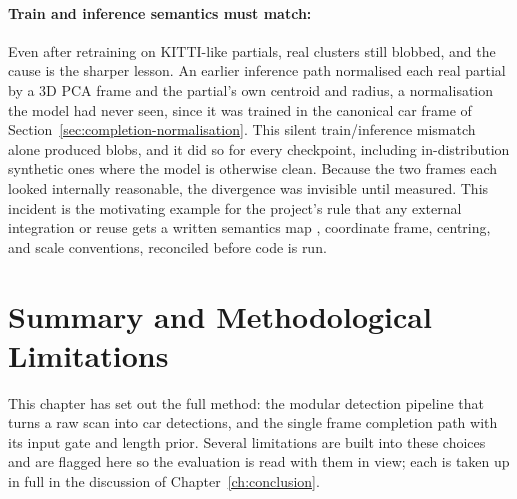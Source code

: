\documentclass[a4paper,12pt]{report}
\begin{document}
\paragraph{Train and inference semantics must match:}
\label{sec:completion-inferencebug}
Even after retraining on KITTI-like partials, real clusters still blobbed, and the
cause is the sharper lesson. An earlier inference path normalised each real partial by
a 3D PCA frame and the partial's own centroid and radius, a normalisation the
model had never seen, since it was trained in the canonical car frame of
Section~\ref{sec:completion-normalisation}. This silent train/inference mismatch alone
produced blobs, and it did so for every checkpoint, including in-distribution
synthetic ones where the model is otherwise clean. Because the two frames each looked
internally reasonable, the
divergence was invisible until measured. This incident is the motivating example for
the project's rule that any external integration or reuse gets a written semantics map
, coordinate frame, centring, and scale conventions, reconciled before code is
run.

\section{Summary and Methodological Limitations}
\label{sec:meth-limitations}

This chapter has set out the full method: the modular detection pipeline that turns a
raw scan into car detections, and the single frame completion path with its input gate and
length prior. Several limitations are built into these choices and are flagged here so the
evaluation is read with them in view; each is taken up in full in the discussion of
Chapter~\ref{ch:conclusion}.
\end{document}
